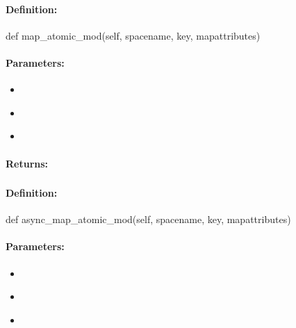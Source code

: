 \paragraph{Definition:}
\begin{pythoncode}
def map_atomic_mod(self, spacename, key, mapattributes)
\end{pythoncode}

\paragraph{Parameters:}
\begin{itemize}[noitemsep]
\item {}\\

\item {}\\

\item {}\\

\end{itemize}

\paragraph{Returns:}


\pagebreak
\subsubsection{}
\label{api:python:async_map_atomic_mod}


\paragraph{Definition:}
\begin{pythoncode}
def async_map_atomic_mod(self, spacename, key, mapattributes)
\end{pythoncode}

\paragraph{Parameters:}
\begin{itemize}[noitemsep]
\item {}\\

\item {}\\

\item {}\\

\end{itemize}

